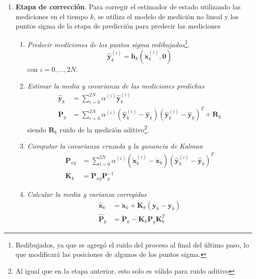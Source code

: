 \begin{enumerate}
\begin{enumerate}
\begin{align}
            \check{\bm{x}}_k &= \sum_{i=0}^{2N}\alpha^{(i)}\check{\bm{x}}_k^{(i)} \\
            \check{\bm{P}}_k &= \sum_{i=0}^{2N}\alpha^{(i)}\left(\check{\bm{x}}_k^{(i)} - \check{\bm{x}}_k\right)\left(\check{\bm{x}}_k^{(i)} - \check{\bm{x}}_k\right)^T + \bm{Q}_{k-1}
        \end{align}
        siendo $\bm{Q}_{k-1}$ el ruido del proceso aditivo\footnote{En caso de no ser aditivo, la ecuación cambia.}.
    \end{enumerate}
    \item \textbf{Etapa de corrección}. Para corregir el estimador de estado utilizando las mediciones en el tiempo $k$, se utiliza el modelo de medición no lineal y los puntos sigma de la etapa de predicción para predecir las mediciones
    \begin{enumerate}
        \item \textit{Predecir mediciones de los puntos sigma redibujados}\footnote{Redibujados, ya que se agregó el ruido del proceso al final del último paso, lo que modificará las posiciones de algunos de los puntos sigma.}.
        \begin{equation}
            \hat{\bm{y}}_k^{(i)} = \bm{h}_k\left(\check{\bm{x}}_k^{(i)},\bm{0}\right)
        \end{equation}
        con $i = 0, ..., 2N$.
        \item \textit{Estimar la media y covarianza de las mediciones predichas}
        \begin{align}
            \hat{\bm{y}}_k &= \sum_{i=0}^{2N}\alpha^{(i)}\hat{\bm{y}}_k^{(i)} \\
            \bm{P}_y &= \sum_{i=0}^{2N}\alpha^{(i)}\left(\hat{\bm{y}}_k^{(i)} - \hat{\bm{y}}_k\right)\left(\hat{\bm{y}}_k^{(i)} - \hat{\bm{y}}_k\right)^T + \bm{R}_k
        \end{align}
        siendo $\bm{R}_k$ ruido de la medición aditivo\footnote{Al igual que en la etapa anterior, esto solo es válido para ruido aditivo}.
        \item \textit{Computar la covarianza cruzada y la ganancia de Kalman}
        \begin{align}
            \bm{P}_{xy} &= \sum_{i=0}^{2N}\alpha^{(i)}\left(\check{\bm{x}}_k^{(i)} -  \check{\bm{x}}_k\right)\left(\hat{\bm{y}}_k^{(i)} -  \hat{\bm{y}}_k\right)^T \\
            \bm{K}_k &= \bm{P}_{xy}\bm{P}_y^{-1}
        \end{align}
        \item \textit{Calcular la media y varianza corregidas}
        \begin{align}
            \hat{\bm{x}}_k &= \check{\bm{x}}_k + \bm{K}_k\left(\bm{y}_k - \hat{\bm{y}}_k\right) \\
            \hat{\bm{P}}_k &= \check{\bm{P}}_k - \bm{K}_k\bm{P}_y\bm{K}_k^T
        \end{align}
    \end{enumerate}
\end{enumerate}

